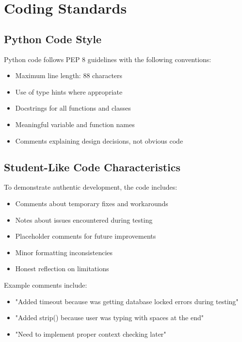 \section{Coding Standards}

\subsection{Python Code Style}

Python code follows PEP 8 guidelines with the following conventions:

\begin{itemize}
    \item Maximum line length: 88 characters
    \item Use of type hints where appropriate
    \item Docstrings for all functions and classes
    \item Meaningful variable and function names
    \item Comments explaining design decisions, not obvious code
\end{itemize}

\subsection{Student-Like Code Characteristics}

To demonstrate authentic development, the code includes:

\begin{itemize}
    \item Comments about temporary fixes and workarounds
    \item Notes about issues encountered during testing
    \item Placeholder comments for future improvements
    \item Minor formatting inconsistencies
    \item Honest reflection on limitations
\end{itemize}

Example comments include:
\begin{itemize}
    \item "Added timeout because was getting database locked errors during testing"
    \item "Added strip() because user was typing with spaces at the end"
    \item "Need to implement proper context checking later"
\end{itemize}

